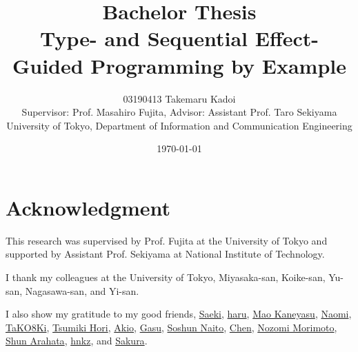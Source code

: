 \documentclass[12pt, a4paper, titlepage]{report}
\title{
  Bachelor Thesis \\
  Type- and Sequential Effect-Guided Programming by Example
}
\author{
  03190413 Takemaru Kadoi
  \\[1cm]
  {\small Supervisor: Prof. Masahiro Fujita},
  {\small Advisor: Assistant Prof. Taro Sekiyama}
  \\[1cm]
  {\small University of Tokyo, Department of Information and Communication Engineering}
}
\date{\today}
\begin{document}



\maketitle
\newpage
\tableofcontents
\newpage

\chapter*{Acknowledgment}
This research was supervised by Prof. Fujita at the University of Tokyo and supported by Assistant Prof. Sekiyama at National Institute of Technology.

I thank my colleagues at the University of Tokyo, Miyasaka-san, Koike-san, Yu-san, Nagasawa-san, and Yi-san.

I also show my gratitude to my good friends,
  \href{https://twitter.com/97sktk}{Saeki},
  \href{https://twitter.com/9SKEgI72RcOWxB8}{haru},
  \href{https://twitter.com/LdCqh1}{Mao Kaneyasu},
  \href{https://twitter.com/NaomiatLibrary}{Naomi},
  \href{https://twitter.com/TaKOBKi}{TaKO8Ki},
  \href{https://twitter.com/Tmstmput}{Tsumiki Hori},
  \href{https://twitter.com/akio_utsuroido}{Akio},
  \href{https://twitter.com/gasukkkgesu}{Gasu},
  \href{https://twitter.com/hamburg_soshun}{Soshun Naito},
  \href{https://twitter.com/macrokoala}{Chen},
  \href{https://twitter.com/nozo_moto}{Nozomi Morimoto},
  \href{https://twitter.com/readonly_true}{Shun Arahata},
  \href{https://twitter.com/wan__nyan__wan}{hnkz},
  and
  \href{https://twitter.com/cheripori}{Sakura}.

\end{document}
